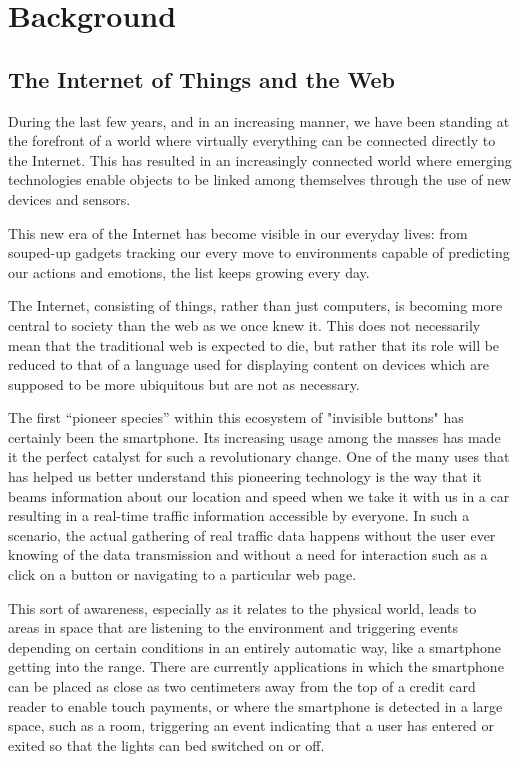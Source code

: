 \chead{}
\chapter{Background}

\section{The Internet of Things and the Web}
\label{section:iot}
During the last few years, and in an increasing manner, we have been standing at the forefront of a world where virtually everything can be connected directly to the Internet. This has resulted in an increasingly connected world where emerging technologies enable objects to be linked among themselves through the use of new devices and sensors.

This new era of the Internet has become visible in our everyday lives: from souped-up gadgets tracking our every move to environments capable of predicting our actions and emotions, the list keeps growing every day.

The Internet, consisting of things, rather than just computers, is becoming more central to society than the web as we once knew it. This does not necessarily mean that the traditional web is expected to die, but rather that its role will be reduced to that of a language used for displaying content on devices which are supposed to be more ubiquitous but are not as necessary.

The first “pioneer species” within this ecosystem of "invisible buttons" has certainly been the smartphone. Its increasing usage among the masses has made it the perfect catalyst for such a revolutionary change. One of the many uses that has helped us better understand this pioneering technology is the way that it beams information about our location and speed when we take it with us in a car resulting in a real-time traffic information accessible by everyone. In such a scenario, the actual gathering of real traffic data happens without the user ever knowing of the data transmission and without a need for interaction such as a click on a button or navigating to a particular web page.

This sort of awareness, especially as it relates to the physical world, leads to areas in space that are listening to the environment and triggering events depending on certain conditions in an entirely automatic way, like a smartphone getting into the range. There are currently applications in which the smartphone can be placed as close as two centimeters away from the top of a credit card reader to enable touch payments, or where the smartphone is detected in a large space, such as a room, triggering an event indicating that a user has entered or exited so that the lights can bed switched on or off.

